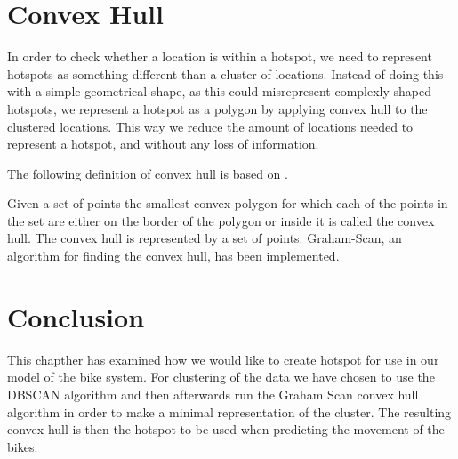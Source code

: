 \section{Convex Hull}\label{convex_hull}
In order to check whether a location is within a hotspot, we need to represent hotspots as something different than a cluster of locations.
Instead of doing this with a simple geometrical shape, as this could misrepresent complexly shaped hotspots, we represent a hotspot as a polygon by applying convex hull to the clustered locations.
This way we reduce the amount of locations needed to represent a hotspot, and without any loss of information.

The following definition of convex hull is based on \citet[section 33.3]{aadbook}.

Given a set of points the smallest convex polygon for which each of the points in the set are either on the border of the polygon or inside it is called the convex hull\cite[33.1-5]{aadbook}.
The convex hull is represented by a set of points.
Graham-Scan\cite[page 1031]{aadbook}, an algorithm for finding the convex hull, has been implemented.


\section{Conclusion}

This chapther has examined how we would like to create hotspot for use in our model of the bike system.
For clustering of the data we have chosen to use the DBSCAN algorithm and then afterwards run the Graham Scan convex hull algorithm in order to make a minimal representation of the cluster.
The resulting convex hull is then the hotspot to be used when predicting the movement of the bikes.

